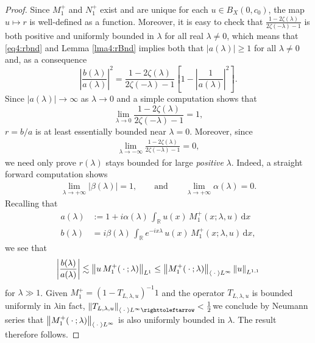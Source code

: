 \documentclass[../dissertation.tex]{subfiles}
\begin{document}
\begin{proof}
	Since $M_1^+$ and $N_1^+$ exist and are unique for each $u \in B_X(0, c_0)$, the 
	map $u \mapsto r$ is well-defined as a function. Moreover, it is easy to check 
	that $\frac{1-2\zeta(\lambda)}{2\zeta(-\lambda)-1}$ is both positive and uniformly
	bounded in $\lambda$ for all real $\lambda \ne 0$, which means that \eqref{eq4:rbnd} and Lemma 
	\ref{lma4:rBnd} implies both that $|a(\lambda)| \geq 1$ for all 
	$\lambda \ne 0$ and, as a consequence
	\[
		\left| \frac{b(\lambda)}{a(\lambda)} \right|^2
			= 
				\frac{1-2\zeta(\lambda)}{2\zeta(-\lambda)-1} 
				\left[
					1 - \left|\frac{1}{a(\lambda)}\right|^2 
				\right].
	\]
	Since $|a(\lambda)| \to \infty$ as $\lambda \to 0$ and a simple computation shows that
	\[
		\lim_{\lambda \to 0} \frac{1-2\zeta(\lambda)}{2\zeta(-\lambda)-1} 
			= 1,
	\]
	$r = b/a$ is at least essentially bounded near $\lambda = 0$. Moreover, 
	since
	\begin{align}
		\label{eq4:rNegLamLimit}
		\lim_{\lambda\to-\infty}\frac{1-2\zeta(\lambda)}{2\zeta(-\lambda)-1}
			= 0,
	\end{align}
	we need only prove $r(\lambda)$ stays bounded for large \textit{positive} 
	$\lambda$. Indeed, a straight forward computation shows
	\begin{align}\label{eq4:reslimits}
		\lim_{\lambda\to+\infty} |\beta(\lambda)| = 1,
		\qquad \text{and} \qquad
		\lim_{\lambda\to+\infty} \alpha(\lambda) = 0.
	\end{align}
	Recalling that
	\begin{align*}
		a(\lambda)
				&:= 1 + i \alpha(\lambda) \,
					\int_{\mathbb R} u(x) \, M_1^+(x; \lambda, u) \, \mathrm{d}x \\
			b(\lambda)
				&= i \beta(\lambda) \, 
					\int_{\mathbb R} 
						e^{-ix\lambda} \, u(x) \, M_1^+(x; \lambda, u) 
					\, \mathrm{d}x,
	\end{align*}
	we see that
	\[
		\left|\frac{b(\lambda)}{a(\lambda)}\right|
			\lesssim \left\| u\,M_1^+(\kern 0.5ex \cdot \kern 0.5ex; \lambda) \right\|_{L^1}
			\leq 
				\left\| M_1^+(\kern 0.5ex \cdot \kern 0.5ex; \lambda) \right\|_{\left\langle \kern 0.5ex \cdot \kern 0.5ex \right\rangle L^\infty} 
				\left\| u \right\|_{L^{1,1}}
	\]
	for $\lambda \gg 1$. Given $M_1^+ = \left(1 - T_{L, \lambda, u} \right)^{-1} 1$
	and the operator $T_{L, \lambda, u}$ is bounded uniformly in 
	$\lambda$\textemdash{}in fact, 
	$\nm{T_{L, \lambda, u}}_{\inn{\dotarg}L^\infty\toitself}
	<\frac{1}{2}$\textemdash{}we conclude by Neumann series that 
	$\left\| M_1^+(\kern 0.5ex \cdot \kern 0.5ex; \lambda) \right\|_{\left\langle \kern 0.5ex \cdot \kern 0.5ex \right\rangle L^\infty}$ is also uniformly 
	bounded in $\lambda$. The result therefore follows.
\end{proof}
\end{document}
